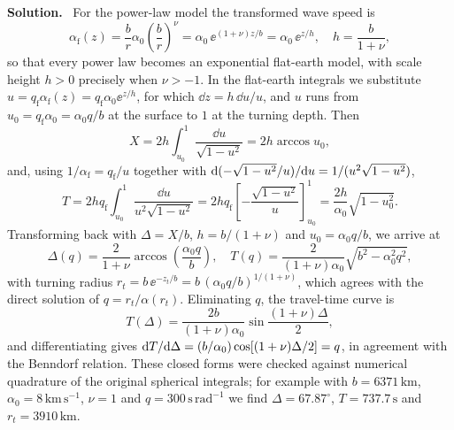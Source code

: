 \documentclass[a4paper,12pt]{paper}
\newcounter{example}
\newenvironment{solution}{\par\noindent\textbf{Solution.}\ }{\par\medskip}
\begin{document}
\begin{solution}
For the power-law model the transformed wave speed is
\begin{equation}
\alpha_{\mathrm{f}}(z)=\frac{b}{r}\alpha_{0}\left(\frac{b}{r}\right)^{\nu}=\alpha_{0}\,\ee^{(1+\nu)z/b}
=\alpha_{0}\,\ee^{z/h},\quad h=\frac{b}{1+\nu},
\label{eq:17}
\end{equation}
so that every power law becomes an exponential flat-earth model, with scale height $h>0$
precisely when $\nu>-1$. In the flat-earth integrals we substitute
$u=q_{\mathrm{f}}\alpha_{\mathrm{f}}(z)=q_{\mathrm{f}}\alpha_{0}\ee^{z/h}$, for which
$\dd z=h\,\dd u/u$, and $u$ runs from $u_{0}=q_{\mathrm{f}}\alpha_{0}=\alpha_{0}q/b$ at the
surface to $1$ at the turning depth. Then
\begin{equation}
X=2h\int_{u_{0}}^{1}\frac{\dd u}{\sqrt{1-u^{2}}}=2h\arccos u_{0},
\label{eq:18}
\end{equation}
and, using $1/\alpha_{\mathrm{f}}=q_{\mathrm{f}}/u$ together with
$\mathrm{d}(-\sqrt{1-u^{2}}/u)/\mathrm{d} u=1/(u^{2}\sqrt{1-u^{2}})$,
\begin{equation}
T=2hq_{\mathrm{f}}\int_{u_{0}}^{1}\frac{\dd u}{u^{2}\sqrt{1-u^{2}}}
=2hq_{\mathrm{f}}\left[-\frac{\sqrt{1-u^{2}}}{u}\right]_{u_{0}}^{1}
=\frac{2h}{\alpha_{0}}\sqrt{1-u_{0}^{2}}.
\label{eq:19}
\end{equation}
Transforming back with $\Delta=X/b$, $h=b/(1+\nu)$ and $u_{0}=\alpha_{0}q/b$, we arrive at
\begin{equation}
\Delta(q)=\frac{2}{1+\nu}\arccos\left(\frac{\alpha_{0}q}{b}\right),\quad
T(q)=\frac{2}{(1+\nu)\alpha_{0}}\sqrt{b^{2}-\alpha_{0}^{2}q^{2}},
\label{eq:20}
\end{equation}
with turning radius $r_{t}=b\,\ee^{-z_{t}/b}=b\,(\alpha_{0}q/b)^{1/(1+\nu)}$, which agrees with
the direct solution of $q=r_{t}/\alpha(r_{t})$. Eliminating $q$, the travel-time curve is
\begin{equation}
T(\Delta)=\frac{2b}{(1+\nu)\alpha_{0}}\sin\frac{(1+\nu)\Delta}{2},
\label{eq:21}
\end{equation}
and differentiating gives $\mathrm{d} T/\mathrm{d}\Delta=(b/\alpha_{0})\cos[(1+\nu)\Delta/2]=q$, in
agreement with the Benndorf relation. These closed forms were checked against numerical
quadrature of the original spherical integrals; for example with $b=6371\,\mathrm{km}$,
$\alpha_{0}=8\,\mathrm{km\,s^{-1}}$, $\nu=1$ and $q=300\,\mathrm{s\,rad^{-1}}$ we find
$\Delta=67.87^{\circ}$, $T=737.7\,\mathrm{s}$ and $r_{t}=3910\,\mathrm{km}$.


\end{solution}
\end{document}
